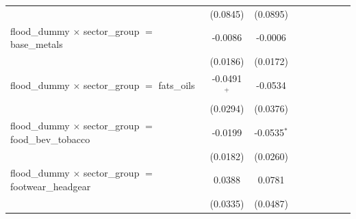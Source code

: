 \begin{tabular}{lcccccccc}
                                                                                  & (0.0845)              & (0.0895)              &                       &                       &                       &                       &                       &   \\   
   flood\_dummy $\times$ sector\_group $=$ base\_metals                           & -0.0086               & -0.0006               &                       &                       &                       &                       &                       &   \\   
                                                                                  & (0.0186)              & (0.0172)              &                       &                       &                       &                       &                       &   \\   
   flood\_dummy $\times$ sector\_group $=$ fats\_oils                             & -0.0491$^{+}$         & -0.0534               &                       &                       &                       &                       &                       &   \\   
                                                                                  & (0.0294)              & (0.0376)              &                       &                       &                       &                       &                       &   \\   
   flood\_dummy $\times$ sector\_group $=$ food\_bev\_tobacco                     & -0.0199               & -0.0535$^{*}$         &                       &                       &                       &                       &                       &   \\   
                                                                                  & (0.0182)              & (0.0260)              &                       &                       &                       &                       &                       &   \\   
   flood\_dummy $\times$ sector\_group $=$ footwear\_headgear                     & 0.0388                & 0.0781                &                       &                       &                       &                       &                       &   \\   
                                                                                  & (0.0335)              & (0.0487)              &                       &                       &                       &                       &                       &   \\   

\end{tabular}
